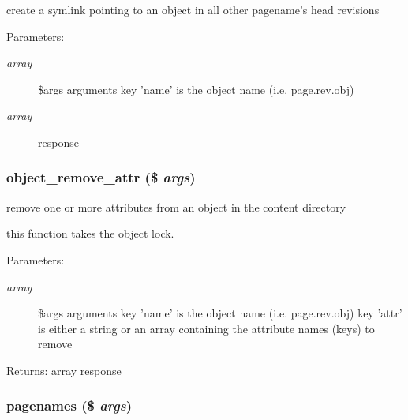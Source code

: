 create a symlink pointing to an object in all other pagename's head revisions

\begin{Desc}
\item[Parameters:]
\begin{description}
\item[{\em array}]\$args arguments key 'name' is the object name (i.e. page.rev.obj) \item[{\em array}]response \end{description}
\end{Desc}
\hypertarget{module__glue_8inc_8php_e16d748c2d933978daec8bf11acdc34b}{
\subsubsection[{object\_\-remove\_\-attr}]{\setlength{\rightskip}{0pt plus 5cm}object\_\-remove\_\-attr (\$ {\em args})}}
\label{module__glue_8inc_8php_e16d748c2d933978daec8bf11acdc34b}


remove one or more attributes from an object in the content directory

this function takes the object lock. \begin{Desc}
\item[Parameters:]
\begin{description}
\item[{\em array}]\$args arguments key 'name' is the object name (i.e. page.rev.obj) key 'attr' is either a string or an array containing the attribute names (keys) to remove \end{description}
\end{Desc}
\begin{Desc}
\item[Returns:]array response \end{Desc}
\hypertarget{module__glue_8inc_8php_354fc85f928484ae3b316bbf0065d9bd}{
\subsubsection[{pagenames}]{\setlength{\rightskip}{0pt plus 5cm}pagenames (\$ {\em args})}}
\label{module__glue_8inc_8php_354fc85f928484ae3b316bbf0065d9bd}


